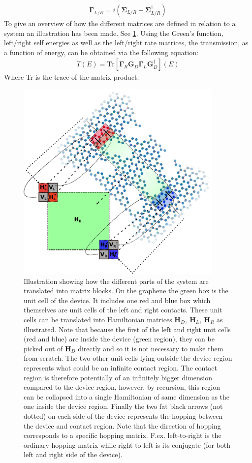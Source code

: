 \begin{align}\label{rateeq}
\mathbf{\Gamma}_{L/R} = i(\mathbf{\Sigma}_{L/R} - \mathbf{\Sigma}^{\dagger}_{L/R})
\end{align}To give an overview of how the different matrices are defined in relation to a system an illustration has been made. See \cref{systemillu}. Using the Green's function, left/right self energies as well as the left/right rate matrices, the transmission, as a function of energy, can be obtained via the following equation:
\begin{align}
    T(E) = \text{Tr}[\mathbf{\Gamma}_R\mathbf{G}_D\mathbf{\Gamma}_L\mathbf{G}_D^{\dagger}](E)
    \label{transeq}
\end{align}
Where Tr is the trace of the matrix product. 
\begin{figure}
    \centering
    \includegraphics[width=0.9\textwidth]{Figures/illu.eps}
    \caption{Illustration showing how the different parts of the system are translated into matrix blocks. On the graphene the green box is the unit cell of the device. It includes one red and blue box which themselves are unit cells of the left and right contacts. These unit cells can be translated into Hamiltonian matrices \(\textbf{H}_D, \ \textbf{H}_L,\ \textbf{H}_R\) as illustrated. Note that because the first of the left and right unit cells (red and blue) are inside the device (green region), they can be picked out of \(\textbf{H}_D\) directly and so it is not necessary to make them from scratch. The two other unit cells lying outside the device region represents what could be an infinite contact region. The contact region is therefore potentially of an infinitely bigger dimension compared to the device region, however, by recursion, this region can be collapsed into a single Hamiltonian of same dimension as the one inside the device region. Finally the two fat black arrows (not dotted) on each side of the device represents the hopping between the device and contact region. Note that the direction of hopping corresponds to a specific hopping matrix. F.ex. left-to-right is the ordinary hopping matrix while right-to-left is its conjugate (for both left and right side of the device).}
    \label{systemillu}
\end{figure}
